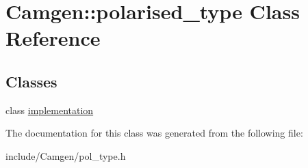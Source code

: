 \hypertarget{a00428}{\section{Camgen\-:\-:polarised\-\_\-type Class Reference}
\label{a00428}
}
\subsection*{Classes}
\begin{DoxyCompactItemize}
\item 
class \hyperlink{a00294}{implementation}
\end{DoxyCompactItemize}


The documentation for this class was generated from the following file\-:\begin{DoxyCompactItemize}
\item 
include/\-Camgen/pol\-\_\-type.\-h\end{DoxyCompactItemize}
